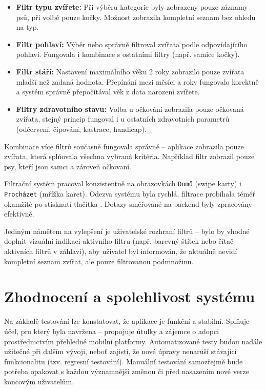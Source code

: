 \documentclass[czech, bp, kiv, he, iso690numb, pdf]{fasthesis}
\begin{document}
    \begin{itemize}
        \item \textbf{Filtr typu zvířete:} Při výběru kategorie  byly zobrazeny pouze záznamy psů, při volbě  pouze kočky. Možnost  zobrazila kompletní seznam bez ohledu na typ.

        \item \textbf{Filtr pohlaví:} Výběr  nebo  správně filtroval zvířata podle odpovídajícího pohlaví. Fungovala i kombinace s ostatními filtry (např. samice kočky).

        \item \textbf{Filtr stáří:} Nastavení maximálního věku 2 roky zobrazilo pouze zvířata mladší než zadaná hodnota. Přepínání mezi měsíci a roky fungovalo korektně a systém správně přepočítával věk z data narození zvířete.

        \item \textbf{Filtry zdravotního stavu:} Volba  u očkování zobrazila pouze očkovaná zvířata, stejný princip fungoval i u ostatních zdravotních parametrů (odčervení, čipování, kastrace, handicap).
    \end{itemize}

    Kombinace více filtrů současně fungovala správně – aplikace zobrazila pouze zvířata, která splňovala všechna vybraná kritéria. Například filtr  zobrazil pouze psy, kteří jsou samci a zároveň očkovaní.

    Filtrační systém pracoval konzistentně na obrazovkách \texttt{Domů} (swipe karty) i \texttt{Procházet} (mřížka karet). Odezva systému byla rychlá, filtrace probíhala téměř okamžitě po stisknutí tlačítka . Dotazy směřované na backend  byly zpracovány efektivně.

    Jediným námětem na vylepšení je uživatelské rozhraní filtrů – bylo by vhodné doplnit vizuální indikaci aktivního filtru (např. barevný štítek nebo čítač aktivních filtrů v záhlaví), aby uživatel byl informován, že aktuálně nevidí kompletní seznam zvířat, ale pouze filtrovanou podmnožinu.






    \section{Zhodnocení a spolehlivost systému}

    Na základě testování lze konstatovat, že aplikace je funkční a stabilní. Splňuje účel, pro který byla navržena -- propojuje útulky a zájemce o adopci prostřednictvím přehledné mobilní platformy. Automatizované testy budou nadále užitečné při dalším vývoji, neboť zajistí, že nové úpravy nenaruší stávající funkcionalitu (tzv. regresní testování). Manuální testování samozřejmě bude potřeba opakovat s každou významnější změnou či před nasazením nové verze koncovým uživatelům.
\end{document}
